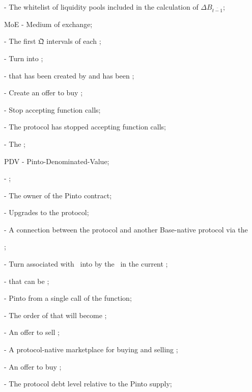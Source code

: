 \documentclass[class=article, crop=false]{standalone}
\begin{document}
\begin{itemize}[topsep=0pt, itemsep=3pt,leftmargin=16pt]
{    \item[]  - The whitelist of liquidity pools included in the calculation of $\Delta B_{\overline{t-1}}$;
    \item[] MoE - Medium of exchange;
    \item[]  - The first $\mathfrak{Q}$ intervals of each ;
    \item[]  - Turn  into ;
    \item[]  -  that has been created by  and has been ;
    \item[]  - Create an offer to buy ;
    \item[]  - Stop accepting  function calls;
    \item[]  - The protocol has stopped accepting  function calls;
    \item[]  - The ;
    \item[] PDV - Pinto-Denominated-Value;
    \item[]  - ;
    \item[]  - The owner of the Pinto contract;
    \item[]  - Upgrades to the protocol;    
    \item[]  - A connection between the protocol and another Base-native protocol via the };
    \item[]  - Turn  associated with  \Pinto\ into  by  the  \Pinto\ in the current ;
    \item[]  -  that can be ;
    \item[]  - Pinto  from a single call of the  function;
    \item[]  - The order of  that will become ;
    \item[]  - An offer to sell ;
    \item[]  - A protocol-native marketplace for buying and selling ;
    \item[]  - An offer to buy ;
    \item[]  - The protocol debt level relative to the Pinto supply;

\end{itemize}
\end{document}
